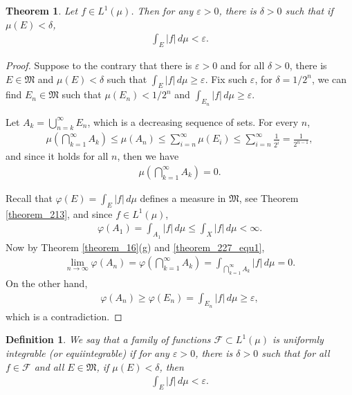 \documentclass[11pt]{book}
\newtheorem{definition}{Definition}[chapter]
\newtheorem{theorem}{Theorem}[chapter]
\theoremstyle{definition}
\numberwithin{equation}{chapter}
\begin{document}
\begin{theorem}\label{theorem_227}
Let $f \in L^1(\mu)$. Then for any $\varepsilon > 0$, there is $\delta > 0$ such that if $\mu(E) < \delta$,
\begin{align*}
    \int_E \left|f\right|\,d\mu < \varepsilon.
\end{align*}
\end{theorem}
\begin{proof}
Suppose to the contrary that there is $\varepsilon > 0$ and for all $\delta > 0$, there is $E \in \mathfrak{M}$ and $\mu(E) < \delta$ such that $\int_E \left|f\right|\,d\mu \geq \varepsilon$. Fix such $\varepsilon$, for $\delta = 1/2^n$, we can find $E_n \in \mathfrak{M}$ such that $\mu(E_n) < 1/2^n$ and $\int_{E_n} \left|f\right|\,d\mu \geq \varepsilon$. 

Let $A_k = \bigcup^\infty_{n=k} E_n$, which is a decreasing sequence of sets. For every $n$,
\begin{align*}
    \mu\left(\bigcap^\infty_{k=1} A_k\right) \leq \mu(A_n) \leq \sum^\infty_{i=n} \mu(E_i) \leq \sum^\infty_{i=n} \frac{1}{2^i} = \frac{1}{2^{n-1}},
\end{align*}
and since it holds for all $n$, then we have
\begin{align}\label{theorem_227_equ1}
    \mu\left(\bigcap^\infty_{k=1} A_k\right) = 0.
\end{align}

Recall that $\varphi(E) = \int_E \left|f\right|\,d\mu$ defines a measure in $\mathfrak{M}$, see Theorem \ref{theorem_213}, and since $f \in L^1(\mu)$,
\begin{align*}
    \varphi(A_1) = \int_{A_1} \left|f\right|\,d\mu \leq \int_X \left|f\right|\,d\mu < \infty.
\end{align*}
Now by Theorem \ref{theorem_16}(g) and \eqref{theorem_227_equ1},
\begin{align*}
    \lim_{n\to\infty} \varphi(A_n) = \varphi\left(\bigcap^\infty_{k=1} A_k\right) = \int_{\bigcap^\infty_{k=1} A_k} \left|f\right|\,d\mu = 0.
\end{align*}
On the other hand,
\begin{align*}
    \varphi(A_n) \geq \varphi(E_n) = \int_{E_n} \left|f\right|\,d\mu \geq \varepsilon,
\end{align*}
which is a contradiction.
\end{proof}

\medskip

\begin{definition}
We say that a family of functions $\mathcal{F} \subset L^1(\mu)$ is uniformly integrable (or equiintegrable) if for any $\varepsilon > 0$, there is $\delta > 0$ such that for all $f \in \mathcal{F}$ and all $E \in \mathfrak{M}$, if $\mu(E) < \delta$, then
\begin{align*}
    \int_E \left|f\right|\,d\mu < \varepsilon.
\end{align*}
\end{definition}
\end{document}
